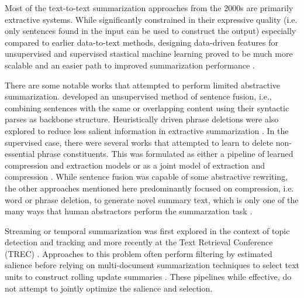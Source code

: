 Most of the text-to-text summarization approaches from the 2000s are primarily
extractive systems.  While significantly constrained in their expressive
quality (i.e. only sentences found in the input can be used to construct the
output) especially compared to earlier data-to-text methods, designing
data-driven features for unsupervised and supervised stastical machine
learning proved to be much more scalable and an easier path to improved
summarization performance \citep{nenkova2011}. 
 
There are some notable works that attempted to perform limited abstractive
summarization. \cite{barzilay2005} developed an unsupervised method of sentence fusion, i.e., combining sentences with the same or overlapping content using their syntactic
parses as backbone structure. Heuristically driven phrase deletions were also
explored to reduce less salient information in extractive summarization
\citep{jing2000,zajic2007}.  In the supervised case, there were several works
that attempted to learn to  delete non-essential phrase constituents. 
This was formulated
as either a pipeline of learned compression and extraction models
\citep{wang2013} or as a joint model of extraction and compression
\citep{martins2009,bergkirkpatrick2011}. While sentence fusion was capable
of some abstractive rewriting, the other approaches
mentioned here predominantly focused on compression, i.e. word or phrase
deletion, to generate novel summary text, which is only one of the many ways
that human abstractors perform the summarzation task \citep{jing2000b}.

  Streaming or temporal summarization was first explored in the context of
 topic detection and tracking \citep{khandelwal2001,allan2001} and more recently at
 the Text Retrieval Conference (TREC) \citep{aslam2013}. Approaches
to this problem often perform filtering by estimated salience before relying
on multi-document summarization techniques to select text units to
construct rolling update summaries \citep{guo2013,mccreadie2014}. These pipelines while effective, do not attempt to jointly optimize the salience and 
selection.

%


